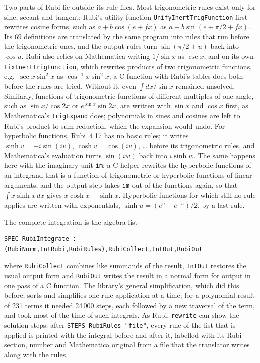 \documentclass[11pt,a4paper]{article}
\begin{document}
Two parts of Rubi lie outside its rule files. Most trigonometric rules exist
only for sine, secant and tangent; Rubi's utility function
\texttt{UnifyInertTrigFunction} first rewrites cosine forms, such as
$a+b\cos(e+fx)$ as $a+b\sin(e+\pi/2+fx)$. Its 69 definitions are translated
by the same program into rules that run before the trigonometric ones, and
the output rules turn $\sin(\pi/2+u)$ back into $\cos u$. Rubi also relies
on Mathematica writing $1/\sin x$ as $\csc x$, and on its own
\texttt{FixInertTrigFunction}, which rewrites products of two trigonometric
functions, e.g.\ $\sec x\sin^2x$ as $\cos^{-1}x\sin^2x$; a C function with
Rubi's tables does both before the rules are tried. Without it, even
$\int dx/\sin x$ remained unsolved. Similarly, functions of
trigonometric functions of different multiples of one angle, such as
$\sin x/\cos 2x$ or $e^{\sin x}\sin 2x$, are written with $\sin x$ and
$\cos x$ first, as Mathematica's \texttt{TrigExpand} does; polynomials in
sines and cosines are left to Rubi's product-to-sum reduction, which the
expansion would undo.
For hyperbolic
functions, Rubi~4.17 has no basic rules; it writes $\sinh v=-i\sin(iv)$,
$\cosh v=\cos(iv)$, \dots{} before its trigonometric rules, and
Mathematica's evaluation turns $\sin(iw)$ back into $i\sinh w$. The same
happens here with the imaginary unit \texttt{im}: a C helper rewrites the hyperbolic functions of
an integrand that is a function of trigonometric or hyperbolic functions of
linear arguments, and the output step takes \texttt{im} out of the
functions again, so that $\int x\sinh x\,dx$ gives $x\cosh x-\sinh x$.
Hyperbolic functions for which still no rule applies are written with
exponentials, $\sinh u=(e^u-e^{-u})/2$, by a last rule.

The complete integration is the algebra list
\begin{lstlisting}
SPEC RubiIntegrate : (RubiNorm,IntRubi,RubiRules),RubiCollect,IntOut,RubiOut
\end{lstlisting}
where \texttt{RubiCollect} combines like summands of the result,
\texttt{IntOut} restores the usual output form and \texttt{RubiOut} writes
the result in a normal form for output in one pass of a C function. The
library's general simplification, which did this before, sorts and
simplifies one rule application at a time; for a polynomial result of 231
terms it needed 24\,000 steps, each followed by a new traversal of the
term, and took most of the time of such integrals. As Rubi, \texttt{rewrite}
can show the solution steps: after \texttt{STEPS RubiRules "file"}, every
rule of the list that is applied is printed with the integral before and
after it, labelled with its Rubi section, number and Mathematica original
from a file that the translator writes along with the rules.
\end{document}
